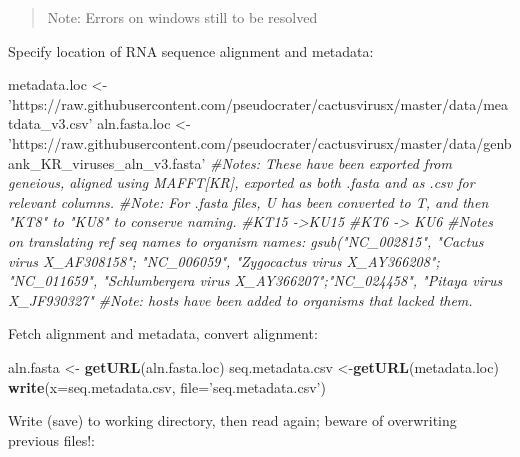 \documentclass[
]{article}
\newenvironment{Shaded}{\begin{snugshade}}{\end{snugshade}}
\newcommand{\CommentTok}[1]{\textcolor[rgb]{0.56,0.35,0.01}{\textit{#1}}}
\newcommand{\DataTypeTok}[1]{\textcolor[rgb]{0.13,0.29,0.53}{#1}}
\newcommand{\KeywordTok}[1]{\textcolor[rgb]{0.13,0.29,0.53}{\textbf{#1}}}
\newcommand{\NormalTok}[1]{#1}
\newcommand{\StringTok}[1]{\textcolor[rgb]{0.31,0.60,0.02}{#1}}
\begin{document}
\begin{quote}
Note: Errors on windows still to be resolved
\end{quote}

Specify location of RNA sequence alignment and metadata:

\begin{Shaded}
\begin{Highlighting}[]
\NormalTok{metadata.loc <-}\StringTok{ 'https://raw.githubusercontent.com/pseudocrater/cactusvirusx/master/data/meatdata_v3.csv'}
\NormalTok{aln.fasta.loc <-}\StringTok{ 'https://raw.githubusercontent.com/pseudocrater/cactusvirusx/master/data/genbank_KR_viruses_aln_v3.fasta'}
\CommentTok{#Notes: These have been exported from geneious, aligned using MAFFT[KR], exported as both .fasta and as .csv for relevant columns.}
\CommentTok{#Note: For .fasta files, U has been converted to T, and then "KT8" to "KU8" to conserve naming. }
\CommentTok{#KT15 ->KU15}
\CommentTok{#KT6 -> KU6}
\CommentTok{#Notes on translating ref seq names to organism names:  gsub("NC_002815", "Cactus virus X_AF308158"; "NC_006059", "Zygocactus virus X_AY366208"; "NC_011659", "Schlumbergera virus X_AY366207";"NC_024458", "Pitaya virus X_JF930327"}
\CommentTok{#Note: hosts have been added to organisms that lacked them.}
\end{Highlighting}
\end{Shaded}

Fetch alignment and metadata, convert alignment:

\begin{Shaded}
\begin{Highlighting}[]
\NormalTok{aln.fasta <-}\StringTok{ }\KeywordTok{getURL}\NormalTok{(aln.fasta.loc)}
\NormalTok{seq.metadata.csv <-}\KeywordTok{getURL}\NormalTok{(metadata.loc)}
\KeywordTok{write}\NormalTok{(}\DataTypeTok{x=}\NormalTok{seq.metadata.csv, }\DataTypeTok{file=}\StringTok{'seq.metadata.csv'}\NormalTok{)}
\end{Highlighting}
\end{Shaded}

Write (save) to working directory, then read again; beware of
overwriting previous files!:
\end{document}
